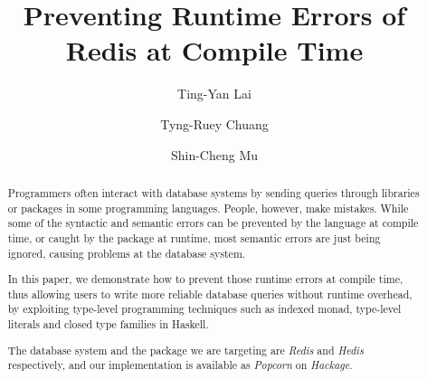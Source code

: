 \documentclass{llncs}
\begin{document}
\title{Preventing Runtime Errors of Redis at Compile Time}
\author{Ting-Yan Lai \and Tyng-Ruey Chuang 
  \and Shin-Cheng Mu }

\maketitle

\begin{abstract}
Programmers often interact with database systems by sending queries through libraries or packages in some programming languages. People, however, make mistakes.
While some of the syntactic and semantic errors can be prevented by the
 language at compile time, or caught by the package at runtime, most semantic
 errors are just being ignored, causing problems at the database system.

In this paper, we demonstrate how to prevent those runtime errors at compile
 time, thus allowing users to write more reliable database queries without
 runtime overhead, by exploiting type-level programming techniques such as
 indexed monad, type-level literals and closed type families in Haskell.

The database system and the package we are targeting are \emph{Redis} and
 \emph{Hedis} respectively, and our implementation is available as \emph{Popcorn}
 on \emph{Hackage}.
\end{abstract}















\end{document}
